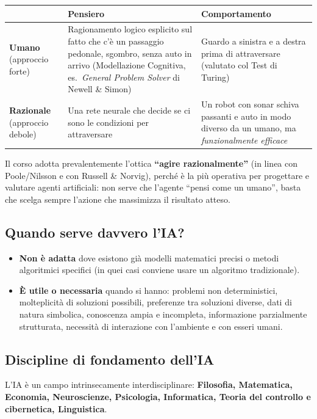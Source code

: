 \documentclass[11pt,a4paper]{report}
\begin{document}
\begin{center}
\begin{tabular}{@{}p{2cm}p{5.7cm}p{5.7cm}@{}}
\toprule
 & \textbf{Pensiero} & \textbf{Comportamento} \\
\midrule
\textbf{Umano} (approccio forte) & Ragionamento logico esplicito sul fatto che c'è un passaggio pedonale, sgombro, senza auto in arrivo (Modellazione Cognitiva, es.\ \emph{General Problem Solver} di Newell \& Simon) & Guardo a sinistra e a destra prima di attraversare (valutato col Test di Turing) \\
\textbf{Razionale} (approccio debole) & Una rete neurale che decide se ci sono le condizioni per attraversare & Un robot con sonar schiva passanti e auto in modo diverso da un umano, ma \emph{funzionalmente efficace} \\
\bottomrule
\end{tabular}
\end{center}

Il corso adotta prevalentemente l'ottica \textbf{``agire razionalmente''} (in linea con Poole/Nilsson e con Russell \& Norvig), perché è la più operativa per progettare e valutare agenti artificiali: non serve che l'agente ``pensi come un umano'', basta che scelga sempre l'azione che massimizza il risultato atteso.

\subsection{Quando serve davvero l'IA?}

\begin{itemize}
  \item \textbf{Non è adatta} dove esistono già modelli matematici precisi o metodi algoritmici specifici (in quei casi conviene usare un algoritmo tradizionale).
  \item \textbf{È utile o necessaria} quando si hanno: problemi non deterministici, molteplicità di soluzioni possibili, preferenze tra soluzioni diverse, dati di natura simbolica, conoscenza ampia e incompleta, informazione parzialmente strutturata, necessità di interazione con l'ambiente e con esseri umani.
\end{itemize}

\subsection{Discipline di fondamento dell'IA}

L'IA è un campo intrinsecamente interdisciplinare: \textbf{Filosofia, Matematica, Economia, Neuroscienze, Psicologia, Informatica, Teoria del controllo e cibernetica, Linguistica}.
\end{document}
